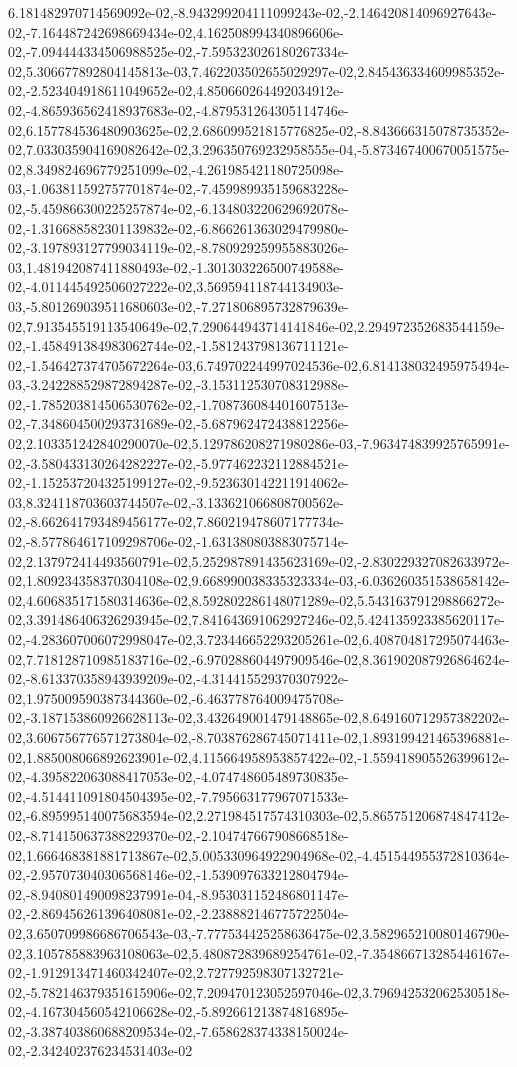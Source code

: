 6.181482970714569092e-02,-8.943299204111099243e-02,-2.146420814096927643e-02,-7.164487242698669434e-02,4.162508994340896606e-02,-7.094444334506988525e-02,-7.595323026180267334e-02,5.306677892804145813e-03,7.462203502655029297e-02,2.845436334609985352e-02,-2.523404918611049652e-02,4.850660264492034912e-02,-4.865936562418937683e-02,-4.879531264305114746e-02,6.157784536480903625e-02,2.686099521815776825e-02,-8.843666315078735352e-02,7.033035904169082642e-02,3.296350769232958555e-04,-5.873467400670051575e-02,8.349824696779251099e-02,-4.261985421180725098e-03,-1.063811592757701874e-02,-7.459989935159683228e-02,-5.459866300225257874e-02,-6.134803220629692078e-02,-1.316688582301139832e-02,-6.866261363029479980e-02,-3.197893127799034119e-02,-8.780929259955883026e-03,1.481942087411880493e-02,-1.301303226500749588e-02,-4.011445492506027222e-02,3.569594118744134903e-03,-5.801269039511680603e-02,-7.271806895732879639e-02,7.913545519113540649e-02,7.290644943714141846e-02,2.294972352683544159e-02,-1.458491384983062744e-02,-1.581243798136711121e-02,-1.546427374705672264e-03,6.749702244997024536e-02,6.814138032495975494e-03,-3.242288529872894287e-02,-3.153112530708312988e-02,-1.785203814506530762e-02,-1.708736084401607513e-02,-7.348604500293731689e-02,-5.687962472438812256e-02,2.103351242840290070e-02,5.129786208271980286e-03,-7.963474839925765991e-02,-3.580433130264282227e-02,-5.977462232112884521e-02,-1.152537204325199127e-02,-9.523630142211914062e-03,8.324118703603744507e-02,-3.133621066808700562e-02,-8.662641793489456177e-02,7.860219478607177734e-02,-8.577864617109298706e-02,-1.631380803883075714e-02,2.137972414493560791e-02,5.252987891435623169e-02,-2.830229327082633972e-02,1.809234358370304108e-02,9.668990038335323334e-03,-6.036260351538658142e-02,4.606835171580314636e-02,8.592802286148071289e-02,5.543163791298866272e-02,3.391486406326293945e-02,7.841643691062927246e-02,5.424135923385620117e-02,-4.283607006072998047e-02,3.723446652293205261e-02,6.408704817295074463e-02,7.718128710985183716e-02,-6.970288604497909546e-02,8.361902087926864624e-02,-8.613370358943939209e-02,-4.314415529370307922e-02,1.975009590387344360e-02,-6.463778764009475708e-02,-3.187153860926628113e-02,3.432649001479148865e-02,8.649160712957382202e-02,3.606756776571273804e-02,-8.703876286745071411e-02,1.893199421465396881e-02,1.885008066892623901e-02,4.115664958953857422e-02,-1.559418905526399612e-02,-4.395822063088417053e-02,-4.074748605489730835e-02,-4.514411091804504395e-02,-7.795663177967071533e-02,-6.895995140075683594e-02,2.271984517574310303e-02,5.865751206874847412e-02,-8.714150637388229370e-02,-2.104747667908668518e-02,1.666468381881713867e-02,5.005330964922904968e-02,-4.451544955372810364e-02,-2.957073040306568146e-02,-1.539097633212804794e-02,-8.940801490098237991e-04,-8.953031152486801147e-02,-2.869456261396408081e-02,-2.238882146775722504e-02,3.650709986686706543e-03,-7.777534425258636475e-02,3.582965210080146790e-02,3.105785883963108063e-02,5.480872839689254761e-02,-7.354866713285446167e-02,-1.912913471460342407e-02,2.727792598307132721e-02,-5.782146379351615906e-02,7.209470123052597046e-02,3.796942532062530518e-02,-4.167304560542106628e-02,-5.892661213874816895e-02,-3.387403860688209534e-02,-7.658628374338150024e-02,-2.342402376234531403e-02
